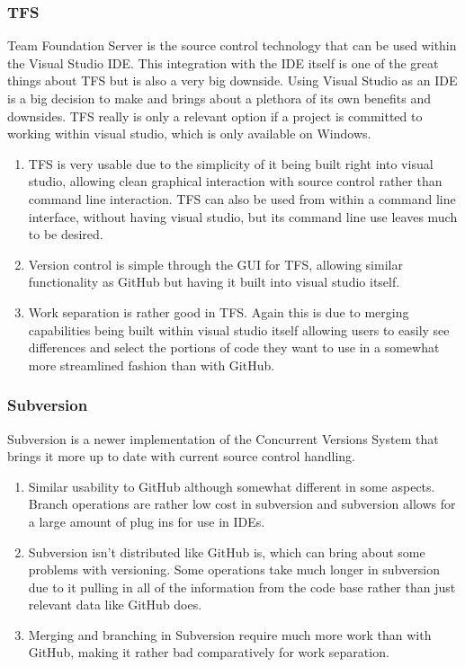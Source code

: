 \documentclass[onecolumn, draftclsnofoot,10pt, compsoc]{IEEEtran}
\begin{document}
\subsubsection{TFS}
Team Foundation Server is the source control technology that can be used within the Visual Studio IDE. This integration with the IDE itself is one of the great things about TFS but is also a very big downside. Using Visual Studio as an IDE is a big decision to make and brings about a plethora of its own benefits and downsides. TFS really is only a relevant option if a project is committed to working within visual studio, which is only available on Windows.
\begin{enumerate}
\item TFS is very usable due to the simplicity of it being built right into visual studio, allowing clean graphical interaction with source control rather than command line interaction. TFS can also be used from within a command line interface, without having visual studio, but its command line use leaves much to be desired.
\item Version control is simple through the GUI for TFS, allowing similar functionality as GitHub but having it built into visual studio itself.
\item Work separation is rather good in TFS. Again this is due to merging capabilities being built within visual studio itself allowing users to easily see differences and select the portions of code they want to use in a somewhat more streamlined fashion than with GitHub.
\end{enumerate}

\subsubsection{Subversion}
Subversion is a newer implementation of the Concurrent Versions System that brings it more up to date with current source control handling.
\begin{enumerate}
\item Similar usability to GitHub although somewhat different in some aspects. Branch operations are rather low cost in subversion and subversion allows for a large amount of plug ins for use in IDEs.
\item Subversion isn't distributed like GitHub is, which can bring about some problems with versioning. Some operations take much longer in subversion due to it pulling in all of the information from the code base rather than just relevant data like GitHub does.
\item Merging and branching in Subversion require much more work than with GitHub, making it rather bad comparatively for work separation.
\end{enumerate}
\end{document}
